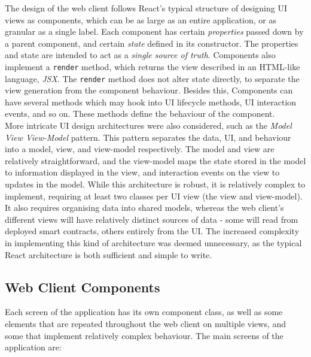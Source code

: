 The design of the web client follows React's typical structure of designing UI views as components, which can be as large as an entire application, or as granular as a single label. Each component has certain \textit{properties} passed down by a parent component, and certain \textit{state} defined in its constructor. The properties and state are intended to act as a \textit{single source of truth}. Components also implement a \texttt{render} method, which returns the view described in an HTML-like language, \textit{JSX}. The \texttt{render} method does not alter state directly, to separate the view generation from the component behaviour. Besides this, Components can have several methods which may hook into UI lifecycle methods, UI interaction events, and so on. These methods define the behaviour of the component. \\

More intricate UI design architectures were also considered, such as the \textit{Model View View-Model} pattern. This pattern separates the data, UI, and behaviour into a model, view, and view-model respectively. The model and view are relatively straightforward, and the view-model maps the state stored in the model to information displayed in the view, and interaction events on the view to updates in the model. While this architecture is robust, it is relatively complex to implement, requiring at least two classes per UI view (the view and view-model). It also requires organising data into shared models, whereas the web client's different views will have relatively distinct sources of data - some will read from deployed smart contracts, others entirely from the UI. The increased complexity in implementing this kind of architecture was deemed unnecessary, as the typical React architecture is both sufficient and simple to write.


\subsection{Web Client Components}

Each screen of the application has its own component class, as well as some elements that are repeated throughout the web client on multiple views, and some that implement relatively complex behaviour. The main screens of the application are: \\

